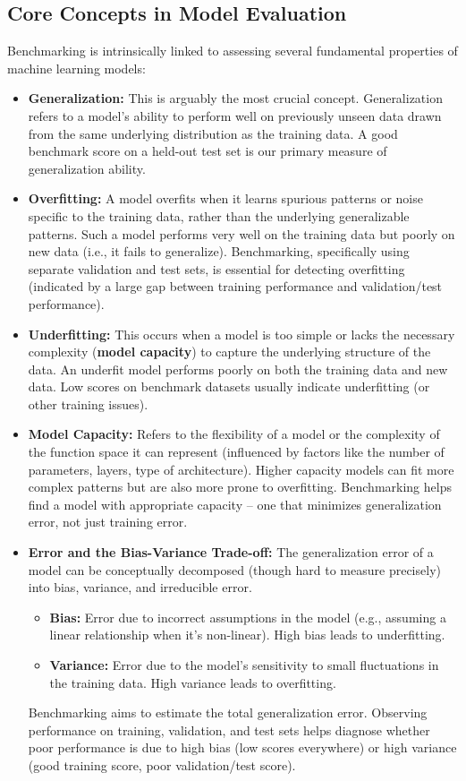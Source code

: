 \documentclass{article}
\begin{document}
\subsection{Core Concepts in Model Evaluation}

Benchmarking is intrinsically linked to assessing several fundamental properties of machine learning models:

\begin{itemize}
    \item \textbf{Generalization:} This is arguably the most crucial concept. Generalization refers to a model's ability to perform well on previously unseen data drawn from the same underlying distribution as the training data. A good benchmark score on a held-out test set is our primary measure of generalization ability.
    \item \textbf{Overfitting:} A model overfits when it learns spurious patterns or noise specific to the training data, rather than the underlying generalizable patterns. Such a model performs very well on the training data but poorly on new data (i.e., it fails to generalize). Benchmarking, specifically using separate validation and test sets, is essential for detecting overfitting (indicated by a large gap between training performance and validation/test performance).
    \item \textbf{Underfitting:} This occurs when a model is too simple or lacks the necessary complexity (\textbf{model capacity}) to capture the underlying structure of the data. An underfit model performs poorly on both the training data and new data. Low scores on benchmark datasets usually indicate underfitting (or other training issues).
    \item \textbf{Model Capacity:} Refers to the flexibility of a model or the complexity of the function space it can represent (influenced by factors like the number of parameters, layers, type of architecture). Higher capacity models can fit more complex patterns but are also more prone to overfitting. Benchmarking helps find a model with appropriate capacity – one that minimizes generalization error, not just training error.
    \item \textbf{Error and the Bias-Variance Trade-off:} The generalization error of a model can be conceptually decomposed (though hard to measure precisely) into bias, variance, and irreducible error.
        \begin{itemize}
            \item \textbf{Bias:} Error due to incorrect assumptions in the model (e.g., assuming a linear relationship when it's non-linear). High bias leads to underfitting.
            \item \textbf{Variance:} Error due to the model's sensitivity to small fluctuations in the training data. High variance leads to overfitting.
        \end{itemize}
    Benchmarking aims to estimate the total generalization error. Observing performance on training, validation, and test sets helps diagnose whether poor performance is due to high bias (low scores everywhere) or high variance (good training score, poor validation/test score).
\end{itemize}
\end{document}
